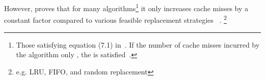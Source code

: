%
However, \citeauthor{coa-thesis} proves that for many algorithms\footnote{%
   Those satisfying equation (7.1) in~\cite[46]{coa-thesis}.  If the number of cache
   misses incurred by the algorithm only , the  is satisfied~\cite[6]{erikcom}.
}
it only increases cache misses by a constant factor compared to various feasible
replacement strategies%
~\cite[corollary 19, \pno~46]{coa-thesis}.%
\footnote{%
   e.g. LRU, FIFO, and random replacement
}

%
%

